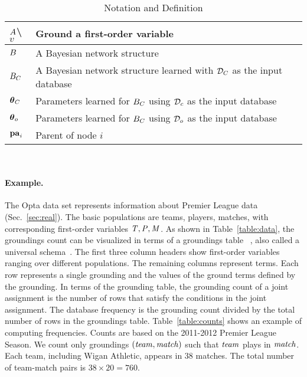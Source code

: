 {{\begin{table}
{\begin{tabular}{|l|l|}
 	 	      			$A$\textbackslash$v$& Ground a first-order variable\\\hline
 	 	      			
 	 	      			$B$&A Bayesian network structure\\\hline
 	 	      			$B_{C}$ & A Bayesian network structure learned with $\mathcal{D}_{C}$ as the input database\\\hline
 	 	      			$\boldsymbol{\theta}_{C}$ & Parameters learned for $B_{C}$ using $\mathcal{D}_{c}$  as the input database\\\hline
 	 	      			$\boldsymbol{\theta}_{o}$ & Parameters learned for $B_{C}$ using $\mathcal{D}_{o}$  as the input database\\\hline
 	 	      			$\mathbf{pa}_{i}$&Parent of node $i$\\\hline
 	 	      		\end{tabular}} 	\caption[Table of Notations]{Notation and Definition	\label{table:notation}}
 	 	      	\end{table}\\
			
			\paragraph{Example.}
\label{sec:example}
%
The Opta data set represents information about Premier League data %
(Sec.~\ref{sec:real}). 
The basic populations are teams, players, matches, with 
corresponding first-order variables $\it{T}, \it{P}, \it{M}$. As shown in Table~\ref{table:data}, the groundings count can be visualized in terms of a groundings table ~\citep{Schulte2014}, also called a universal schema~\citep{Riedel2013}. 
The first three column headers show first-order variables ranging over different populations. The remaining columns represent terms. Each row represents a single grounding and the values of the ground terms defined by the grounding.
In terms of the grounding table, the grounding count of a joint assignment is the number of rows that satisfy the conditions in the joint assignment. The database frequency is the grounding count divided by the total number of rows in the groundings table. Table~\ref{table:counts} shows an example of computing frequencies. Counts are based on the 2011-2012 Premier League Season. We count only groundings $(\it{team},\it{match})$ such that $\it{team}$ plays in $\it{match}$. Each team, including Wigan Athletic, appears in 38 matches. The total number of team-match pairs is $38 \times 20 = 760$.

}}
